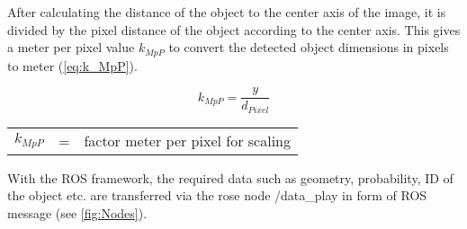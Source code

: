 After calculating the distance of the object to the center axis of the image, it is divided by the pixel distance of the object according to the center axis. This gives a meter per pixel value $k_{MpP}$ to convert the detected object dimensions in pixels to meter (\cref{eq:k_MpP}).

\begin{equation}
	k_{MpP} = \frac{y}{d_{Pixel}}
	\label{eq:k_MpP}
\end{equation}
\begin{table}[!h]
	\begin{center}
		\begin{tabular}{l c l}
			$k_{MpP}$ & = & factor meter per pixel for scaling\\
		\end{tabular}
	\end{center}
\end{table}

With the \ac{ROS} framework, the required data such as geometry, probability, \ac{ID} of the object etc. are transferred via the rose node /data\_play in form of \ac{ROS} message (see \cref{fig:Nodes}).

